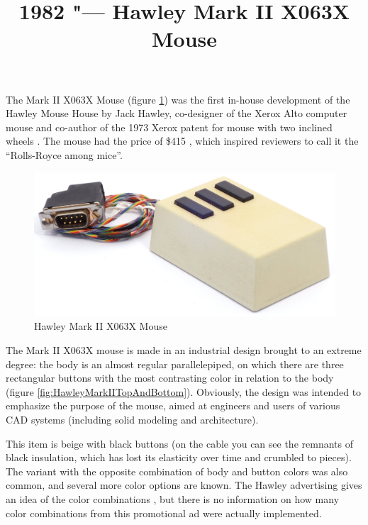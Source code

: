 \documentclass[11pt, a4paper]{article}
\begin{document}
\title{1982 "--- Hawley Mark II X063X Mouse}
\date{}
\maketitle
{}
The Mark II X063X Mouse (figure \ref{fig:HawleyMarkIIPic}) was the first in-house development of the Hawley Mouse House \cite{hawley,mouses} by Jack Hawley, co-designer of the Xerox Alto computer mouse and co-author of the 1973 Xerox patent for mouse with two inclined wheels \cite{pat}. The mouse had the price of \$415 \cite{buxton}, which inspired reviewers to call it the ``Rolls-Royce among mice''.

\begin{figure}[h]
   \centering
    \includegraphics[scale=0.6]{1982_hawley_mark_ii/pic_60.jpg}
    \caption{Hawley Mark II X063X Mouse}
    \label{fig:HawleyMarkIIPic}
\end{figure}

The Mark II X063X mouse is made in an industrial design brought to an extreme degree: the body is an almost regular parallelepiped, on which there are three rectangular buttons with the most contrasting color in relation to the body (figure \ref{fig:HawleyMarkIITopAndBottom}). Obviously, the design was intended to emphasize the purpose of the mouse, aimed at engineers and users of various CAD systems (including solid modeling and architecture).

This item is beige with black buttons (on the cable you can see the remnants of black insulation, which has lost its elasticity over time and crumbled to pieces). The variant with the opposite combination of body and button colors was also common, and several more color options are known. The Hawley advertising gives an idea of the color combinations \cite{brochure}, but there is no information on how many color combinations from this promotional ad were actually implemented.
\end{document}
